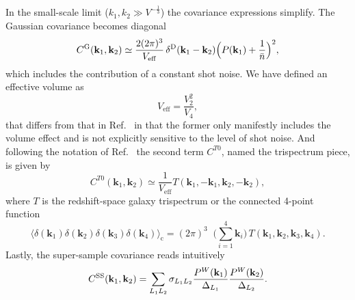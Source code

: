 \documentclass[a4paper,11pt]{article}
\let\d\relax
\DeclareMathOperator{\d}{d}
\DeclareMathOperator{\deltaD}{\delta^\mathrm{D}}
\newcommand{\vk}{\mathbf{k}}
\newcommand{\nbar}{\bar{n}}
\renewcommand{\SS}{\mathrm{SS}}
\newcommand{\eff}{\mathrm{eff}}
\newcommand{\Gauss}{\mathrm{G}}
\begin{document}
In the small-scale limit ($k_1, k_2\gg V^{-\frac13}$) the covariance
expressions simplify.
The Gaussian covariance becomes diagonal
\begin{equation}
    C^\Gauss(\vk_1,\vk_2) \simeq \frac{2(2\pi)^3}{V_\eff} \deltaD(\vk_1 - \vk_2)
    \Bigl( P(\vk_1) + \frac1{\nbar} \Bigr)^2,
\end{equation}
which includes the contribution of a constant shot noise.
We have defined an effective volume as
\begin{equation}
    V_\eff = \frac{V_2^2}{V_4},
\end{equation}
that differs from that in Ref.~\cite{Tegmark97gal} in that the former only
manifestly includes the volume effect and is not explicitly sensitive to the
level of shot noise.
And following the notation of Ref.~\cite{TakadaHu13} the second term $C^{T0}$,
named the trispectrum piece, is given by
\begin{equation}
    \label{C_T0}
    C^{T0}(\vk_1,\vk_2) \simeq \frac1{V_\eff} T(\vk_1,-\vk_1,\vk_2,-\vk_2),
\end{equation}
where $T$ is the redshift-space galaxy trispectrum or the connected 4-point
function
\begin{equation}
    \bigl\langle\delta(\vk_1)\delta(\vk_2)\delta(\vk_3)\delta(\vk_4)\bigr\rangle_\mathrm{c}
    = (2\pi)^3 \deltaD\bigl({\textstyle\sum_{i=1}^4}\vk_i\bigr)\,
    T(\vk_1,\vk_2,\vk_3,\vk_4).
\end{equation}
Lastly, the super-sample covariance reads intuitively
\begin{equation}
    C^\SS(\vk_1,\vk_2) = \sum_{L_1L_2} \sigma_{L_1L_2}
    \frac{\d P^W(\vk_1)}{\d\Delta_{L_1}}\frac{\d P^W(\vk_2)}{\d\Delta_{L_2}}.
\end{equation}
\end{document}
